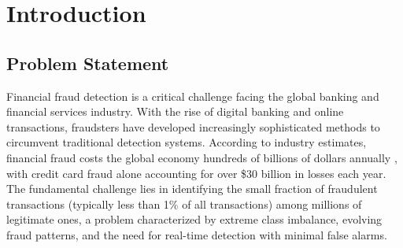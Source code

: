 \chapter{Introduction}
\label{ch:introduction}

\section{Problem Statement}

Financial fraud detection is a critical challenge facing the global banking and financial services industry. With the rise of digital banking and online transactions, fraudsters have developed increasingly sophisticated methods to circumvent traditional detection systems. According to industry estimates, financial fraud costs the global economy hundreds of billions of dollars annually \cite{singh2024comprehensive}, with credit card fraud alone accounting for over \$30 billion in losses each year. The fundamental challenge lies in identifying the small fraction of fraudulent transactions (typically less than 1\% of all transactions) among millions of legitimate ones, a problem characterized by extreme class imbalance, evolving fraud patterns, and the need for real-time detection with minimal false alarms.

